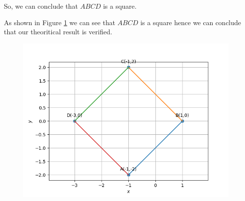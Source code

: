\documentclass[12pt]{article}
\begin{document}
\begin{enumerate}
	So, we can conclude that $ABCD$ is a square.

	As shown in Figure \ref{fig:Fig1} we can see that $ABCD$ is a square hence we can conclude that our theoritical result is verified.
 
\begin{figure}[!h]
	\begin{center} 
	    \includegraphics[width=\columnwidth]{figs/quad1}
	\end{center}
\caption{}
\label{fig:Fig1}
\end{figure}


\end{enumerate}
\end{document}
